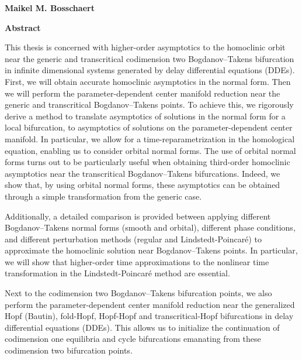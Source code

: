 \thispagestyle{plain}
\begin{center}
    \Large
    \textbf{\thesistitle}
        
    \vspace{0.4cm}
    \large
    \thesissubtitle
        
    \vspace{0.4cm}
    \textbf{Maikel M. Bosschaert}
       
    \vspace{0.9cm}
    \textbf{Abstract}
\end{center}
This thesis is concerned with higher-order asymptotics to the homoclinic orbit
near the generic and transcritical codimension two Bogdanov--Takens bifurcation
in infinite dimensional systems generated by delay differential equations (DDEs).
First, we will obtain accurate homoclinic asymptotics in the normal form. Then we
will perform the parameter-dependent center manifold reduction near the generic
and transcritical Bogdanov--Takens points. To achieve this, we rigorously derive
a method to translate asymptotics of solutions in the normal form for a local
bifurcation, to asymptotics of solutions on the parameter-dependent center
manifold. In particular, we allow for a time-reparametrization in the homological
equation, enabling us to consider orbital normal forms. The use of orbital normal
forms turns out to be particularly useful when obtaining third-order homoclinic
asymptotics near the transcritical Bogdanov--Takens bifurcations. Indeed, we show
that, by using orbital normal forms, these asymptotics can be obtained through a
simple transformation from the generic case.

Additionally, a detailed comparison is provided between applying different
Bogdanov--Takens normal forms (smooth and orbital), different phase conditions,
and different perturbation methods (regular and Lindstedt-Poincar\'e) to
approximate the homoclinic solution near Bogdanov--Takens points. In particular,
we will show that higher-order time approximations to the nonlinear time
transformation in the Lindstedt-Poincar\'e method are essential. 

Next to the codimension two Bogdanov--Takens bifurcation points, we also
perform the parameter-dependent center manifold reduction near the generalized
Hopf (Bautin), fold-Hopf, Hopf-Hopf and transcritical-Hopf bifurcations in
delay differential equations (DDEs). This allows us to initialize the
continuation of codimension one equilibria and cycle bifurcations emanating
from these codimension two bifurcation points.


